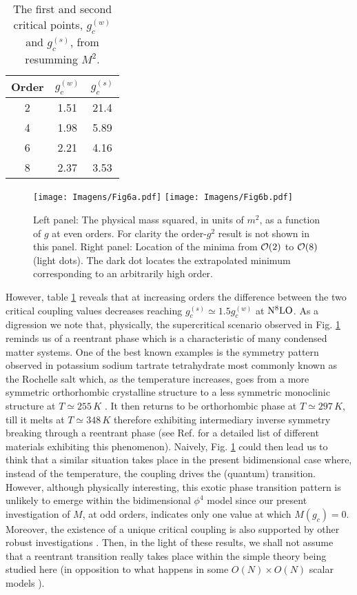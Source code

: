 \documentclass[a4paper,11pt]{article}
\begin{document}
\begin{table}[ht!]
    \centering
        \begin{tabular}{ |c|c|c|  }
            \hline
            Order  & $g_c^{(w)}$ & $g_c^{(s)}$ \\
            \hline
            2 & 1.51 & 21.4 \\ 
            4 & 1.98 & 5.89 \\
            6 & 2.21 & 4.16 \\
            8 & 2.37 & 3.53 \\ \hline
        \end{tabular}
    \caption{The first and second critical points, $g_c^{(w)}$ and $g_c^{(s)}$, from resumming $M^2$. }
 \label{tabela3}   
\end{table}
\begin{figure}[ht!]
    \centering
    \texttt{[image: Imagens/Fig6a.pdf]}
    \qquad
     \texttt{[image: Imagens/Fig6b.pdf]}
    \caption{Left panel: The  physical mass squared, in units of $m^2$,  as a function of $g$ at even orders. For clarity the order-$g^2$ result is not shown in this panel. Right panel: Location of the minima from ${\cal O}(2)$ to ${\cal O}(8)$ (light dots).  The dark dot locates the extrapolated minimum corresponding to an arbitrarily high order.}
    \label{Fig6}
\end{figure}
However, table \ref{tabela3} reveals that at increasing orders the difference between the two critical coupling values decreases reaching  $g_c^{(s)} \simeq 1.5 g_c^{(w)}$ at ${\rm N}^8{\rm LO}$.  As a digression we note that, physically, the supercritical scenario observed in Fig. \ref{Fig6} reminds us of a reentrant phase which is a characteristic of many condensed matter systems.  One of the best known examples is the symmetry pattern observed in potassium sodium tartrate tetrahydrate most commonly known as the Rochelle salt which, as the temperature increases, goes   from a more symmetric orthorhombic crystalline structure to a less symmetric monoclinic structure at $T\simeq 255\, K$ \cite{ISB}. It then returns to be orthorhombic phase at $T\simeq 297 \,K$, till it melts at $T\simeq 348\,K$   therefore exhibiting  intermediary inverse symmetry breaking through a reentrant phase (see  Ref. \cite{condmatt} for a detailed list of different materials exhibiting this phenomenon).
Naively, Fig. \ref{Fig6} could then lead us to think that  a similar situation  takes place in the present bidimensional case where, instead of the temperature, the coupling drives the (quantum) transition.   However, although physically interesting, this exotic phase transition pattern is unlikely to emerge within the bidimensional $\phi^4$ model since our present investigation of $M$, at odd orders, indicates only one value at which $M(g_c)=0$. Moreover, the existence of a unique critical coupling  is also supported by other robust investigations \cite {hamilton6, hamilton7, serone1, serone3}.  Then, in the light of these results, we shall  not assume that a  reentrant transition  really takes place within the simple theory being studied here (in opposition to what happens in some $O(N)\times O(N)$ scalar models \cite{julia}). 
\end{document}
